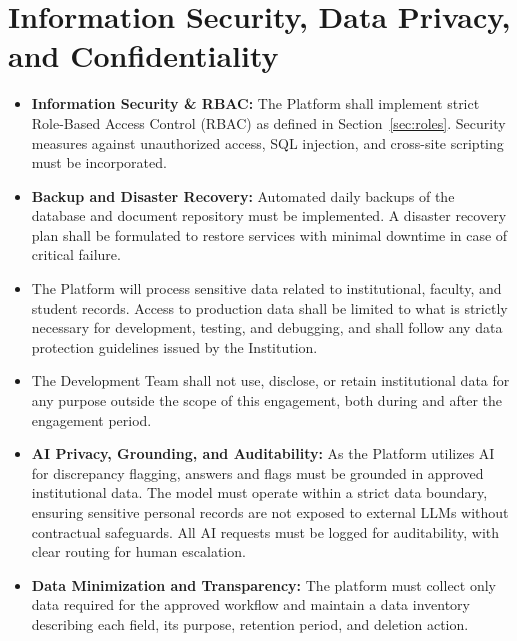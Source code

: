 \documentclass[11pt]{article}
\begin{document}
\section{Information Security, Data Privacy, and Confidentiality}
\begin{itemize}[leftmargin=1.4em, itemsep=3pt]
\item \textbf{Information Security \& RBAC:} The Platform shall implement strict Role-Based Access Control (RBAC) as defined in Section~\ref{sec:roles}. Security measures against unauthorized access, SQL injection, and cross-site scripting must be incorporated.
\item \textbf{Backup and Disaster Recovery:} Automated daily backups of the database and document repository must be implemented. A disaster recovery plan shall be formulated to restore services with minimal downtime in case of critical failure.
\item The Platform will process sensitive data related to institutional, faculty, and student records. Access to production data shall be limited to what is strictly necessary for development, testing, and debugging, and shall follow any data protection guidelines issued by the Institution.
\item The Development Team shall not use, disclose, or retain institutional data for any purpose outside the scope of this engagement, both during and after the engagement period.
\item \textbf{AI Privacy, Grounding, and Auditability:} As the Platform utilizes AI for discrepancy flagging, answers and flags must be grounded in approved institutional data. The model must operate within a strict data boundary, ensuring sensitive personal records are not exposed to external LLMs without contractual safeguards. All AI requests must be logged for auditability, with clear routing for human escalation.
\item \textbf{Data Minimization and Transparency:} The platform must collect only data required for the approved workflow and maintain a data inventory describing each field, its purpose, retention period, and deletion action.
\end{itemize}

\end{document}
